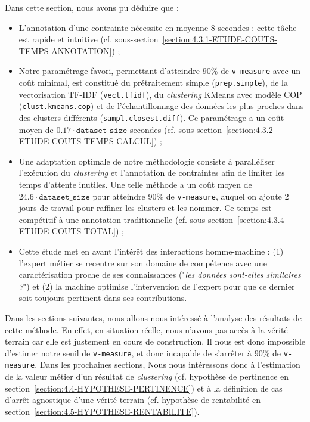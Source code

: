 			\begin{leftBarSummary}
				Dans cette section, nous avons pu déduire que :
				\begin{itemize}
					\item L'annotation d'une contrainte nécessite en moyenne $8$ secondes : cette tâche est rapide et intuitive (cf. sous-section~\ref{section:4.3.1-ETUDE-COUTS-TEMPS-ANNOTATION}) ;
					\item Notre paramétrage favori, permettant d'atteindre $90$\% de \texttt{v-measure} avec un coût minimal, est constitué du prétraitement simple (\texttt{prep.simple}), de la vectorisation TF-IDF (\texttt{vect.tfidf}), du \textit{clustering} KMeans avec modèle COP (\texttt{clust.kmeans.cop}) et de l'échantillonnage des données les plus proches dans des clusters différents (\texttt{sampl.closest.diff}). Ce paramétrage a un coût moyen de $0.17 \cdot \texttt{dataset\_size}$ secondes (cf. sous-section~\ref{section:4.3.2-ETUDE-COUTS-TEMPS-CALCUL}) ;
					\item Une adaptation optimale de notre méthodologie consiste à paralléliser l'exécution du \textit{clustering} et l'annotation de contraintes afin de limiter les temps d'attente inutiles. Une telle méthode a un coût moyen de $24.6 \cdot \texttt{dataset\_size}$ pour atteindre $90$\% de \texttt{v-measure}, auquel on ajoute $2$ jours de travail pour raffiner les clusters et les nommer. Ce temps est compétitif à une annotation traditionnelle (cf. sous-section~\ref{section:4.3.4-ETUDE-COUTS-TOTAL}) ;
					\item Cette étude met en avant l'intérêt des interactions homme-machine : (1) l'expert métier se recentre sur son domaine de compétence avec une caractérisation proche de ses connaissances ("\textit{les données sont-elles similaires ?}") et (2) la machine optimise l'intervention de l'expert pour que ce dernier soit toujours pertinent dans ses contributions.
				\end{itemize}
			\end{leftBarSummary}
		
		Dans les sections suivantes, nous allons nous intéressé à l'analyse des résultats de cette méthode.
		En effet, en situation réelle, nous n'avons pas accès à la vérité terrain car elle est justement en cours de construction.
		Il nous est donc impossible d'estimer notre seuil de \texttt{v-measure}, et donc incapable de s'arrêter à $90$\% de \texttt{v-measure}.
		Dans les prochaines sections, Nous nous intéressons donc à l'estimation de la valeur métier d'un résultat de \textit{clustering} (cf. hypothèse de pertinence en section~\ref{section:4.4-HYPOTHESE-PERTINENCE}) et à la définition de cas d'arrêt agnostique d'une vérité terrain  (cf. hypothèse de rentabilité en section~\ref{section:4.5-HYPOTHESE-RENTABILITE}).